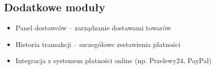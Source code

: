 \subsection{Dodatkowe moduły}
\label{subsec:Dodatkowe moduły}
\begin{itemize}
\item Panel dostawców – zarządzanie dostawami towarów
\item Historia transakcji – szczegółowe zestawienia płatności
\item Integracja z systemem płatności online (np. Przelewy24, PayPal)
\end{itemize}